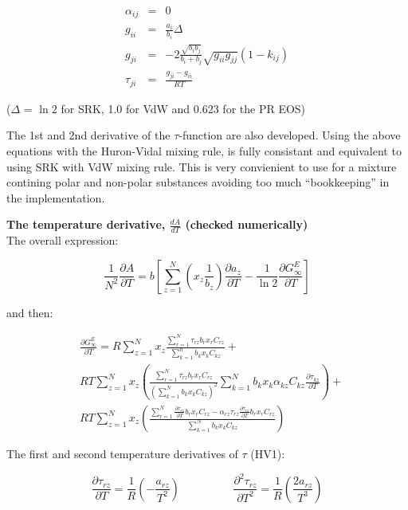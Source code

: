 \documentclass[a4paper, 12pt, english, sintefheadings, sintefcolour]{sintefmemo}
\begin{document}
\begin{eqnarray}
\alpha_{ij} & = & 0\\
g_{ii} & = & \frac{a_{i}}{b_{i}}\Delta\\
g_{ji} & = & -2\frac{\sqrt{b_i b_j}}{b_i + b_j}\sqrt{g_{ii}g_{jj}}\left(1-k_{ij}\right)\\
\tau_{ji} &=& \frac{g_{ji}-g_{ii}}{RT} 
\end{eqnarray}


($\Delta$ = $\ln{2}$ for SRK, 1.0 for VdW and 0.623 for the PR EOS)

The 1st and 2nd derivative of the $\tau$-function are also developed.  Using
the above equations with the Huron-Vidal mixing rule, is fully consistant and
equivalent to using SRK with VdW mixing rule. This is very convienient to use
for a mixture contining polar and non-polar substances avoiding too much
``bookkeeping'' in the implementation.

\noindent\hrulefill


\textbf{The temperature derivative, $\frac{dA}{dT}$ (checked numerically)}\\
The overall expression:

\begin{equation}
\frac{1}{N^2}\frac{\partial A}{\partial T}=b\left[\sum_{z=1}^N\left(x_z\frac{1}{b_z}\right)\frac{\partial a_z}{\partial T}-\frac{1}{\ln{2}}\frac{\partial G_{\infty}^E}{\partial T}\right]
\end{equation}

and then:

\begin{equation}
\begin{split}
&\frac{\partial G_{\infty}^E}{\partial T}=R\sum_{z=1}^N x_z\frac{\sum_{r=1}^N\tau_{rz}b_rx_rC_{rz}}{\sum_{k=1}^n b_kx_kC_{kz}}+\\
&RT\sum_{z=1}^N x_z\left(\frac{\sum_{r=1}^N\tau_{rz}b_rx_rC_{rz}}{\left(\sum_{k=1}^N b_kx_kC_{kz}\right)^2}\sum_{k=1}^N b_kx_k\alpha_{kz}C_{kz}\frac{\partial \tau_{kz}}{\partial T}\right)+ \\
&RT\sum_{z=1}^N x_z\left(\frac{\sum_{r=1}^N \frac{\partial \tau_{rz}}{\partial T}b_rx_rC_{rz}-\alpha_{rz}\tau_{rz}\frac{\partial \tau_{rz}}{\partial T}b_rx_rC_{rz}}{\sum_{k=1}^N b_kx_kC_{kz}}\right)
\end{split}
\end{equation}

The first and second temperature derivatives of $\tau$ (HV1):

\begin{equation}
\frac{\partial \tau_{rz}}{\partial T}=\frac{1}{R}\left(-\frac{a_{rz}}{T^2}\right)\hspace{2cm}\frac{\partial^2 \tau_{rz}}{\partial T^2}=\frac{1}{R}\left(\frac{2a_{rz}}{T^3}\right)
\end{equation}
\end{document}
